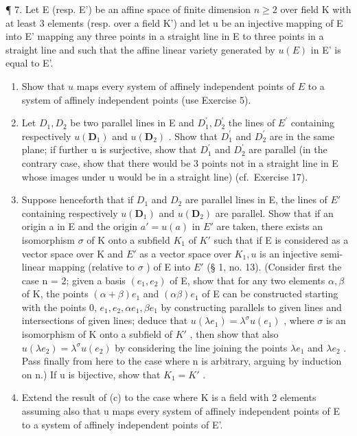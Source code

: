 ¶ 7. Let E (resp. E') be an affine space of finite dimension \(n \geqslant 2\) over field K with at least 3 elements (resp. over a field K') and let u be an injective mapping of E into E' mapping any three points in a straight line in E to three points in a straight line and such that the affine linear variety generated by \(u(E)\) in E' is equal to E'.

\begin{enumerate}
\def\labelenumi{(\alph{enumi})}
\item
  Show that \(u\) maps every system of affinely independent points of \(E\) to a system of affinely independent points (use Exercise 5).
\item
  Let \(D_{1}, D_{2}\) be two parallel lines in E and \(D_{1}^{\prime}, D_{2}^{\prime}\) the lines of \(E^{\prime}\) containing respectively \(u(\mathbf{D}_{1})\) and \(u(\mathbf{D}_{2})\) . Show that \(D_{1}^{\prime}\) and \(D_{2}^{\prime}\) are in the same plane; if further u is surjective, show that \(D_{1}^{\prime}\) and \(D_{2}^{\prime}\) are parallel (in the contrary case, show that there would be 3 points not in a straight line in E whose images under u would be in a straight line) (cf.~Exercise 17).
\item
  Suppose henceforth that if \(D_{1}\) and \(D_{2}\) are parallel lines in E, the lines of \(E'\) containing respectively \(u(\mathbf{D}_{1})\) and \(u(\mathbf{D}_{2})\) are parallel. Show that if an origin a in E and the origin \(a' = u(a)\) in \(E'\) are taken, there exists an isomorphism \(\sigma\) of K onto a subfield \(K_{1}\) of \(K'\) such that if E is considered as a vector space over K and \(E'\) as a vector space over \(K_{1}, u\) is an injective semi-linear mapping (relative to \(\sigma\) ) of E into \(E'\) (§ 1, no. 13). (Consider first the case n = 2; given a basis \((e_{1}, e_{2})\) of E, show that for any two elements \(\alpha, \beta\) of K, the points \((\alpha + \beta)e_{1}\) and \((\alpha\beta)e_{1}\) of E can be constructed starting with the points 0, \(e_{1}, e_{2}, \alpha e_{1}, \beta e_{1}\) by constructing parallels to given lines and intersections of given lines; deduce that \(u(\lambda e_{1}) = \lambda^{\sigma}u(e_{1})\) , where \(\sigma\) is an isomorphism of K onto a subfield of \(K'\) , then show that also \(u(\lambda e_{2}) = \lambda^{\sigma}u(e_{2})\) by considering the line joining the points \(\lambda e_{1}\) and \(\lambda e_{2}\) . Pass finally from here to the case where n is arbitrary, arguing by induction on n.) If u is bijective, show that \(K_{1} = K'\) .
\item
  Extend the result of (c) to the case where K is a field with 2 elements assuming also that u maps every system of affinely independent points of E to a system of affinely independent points of E'.
\end{enumerate}

